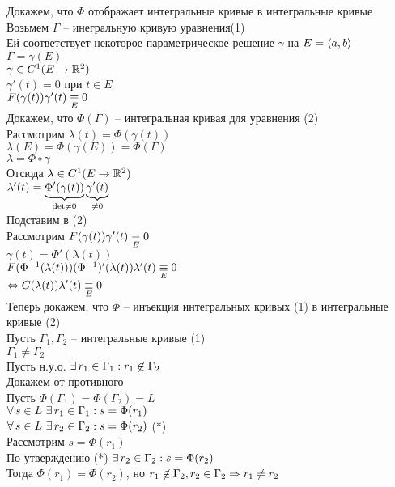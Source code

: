 \documentclass[12pt]{article}
\begin{document}
Докажем, что $\Phi$ отображает интегральные кривые в интегральные кривые\\
Возьмем $\Gamma$ -- инегральную кривую уравнения(1)\\
Ей соответствует некоторое параметрическое решение $\gamma$ на $E=\an ab$\\
$\Gamma = \gamma(E)$\\
$\gamma \in C^1(E\rto \Rset^2)$\\
$\gamma'(t) = 0$ при $t \in E$\\
$F(\gamma(t))\gamma'(t) \us E\equiv 0$\\
Докажем, что $\Phi(\Gamma)$ -- интегральная кривая для уравнения (2)\\
Рассмотрим $\lambda(t) = \Phi(\gamma(t))$\\
$\lambda(E) = \Phi(\gamma(E)) = \Phi(\Gamma)$\\
$\lambda = \Phi \circ \gamma$\\
Отсюда $\lambda \in C^1(E \rto \Rset^2)$\\
$\lambda'(t) = \ub{\det \neq 0}{\Phi'(\gamma(t))}\ub{\neq 0}{\gamma'(t)}$\\
Подставим в (2)\\
Рассмотрим $F(\gamma(t))\gamma'(t) \us E\equiv 0$\\
$\gamma(t) = \Phi'(\lambda(t))$\\
$F(\Phi^{-1}(\lambda(t)))(\Phi^{-1})'(\lambda(t))\lambda'(t)\us E\equiv 0$\\
$\LRto G(\lambda(t))\lambda'(t) \us E\equiv 0$\\
Теперь докажем, что $\Phi$ -- инъекция интегральных кривых (1) в интегральные кривые (2)\\
Пусть $\Gamma_1, \Gamma_2$ -- интегральные кривые (1)\\
$\Gamma_1 \neq \Gamma_2$\\
Пусть н.у.о. $\ex r_1 \in \Gamma_1: r_1 \not\in \Gamma_2$\\
Докажем от противного\\
Пусть $\Phi(\Gamma_1) = \Phi(\Gamma_2) = L$\\
$\fall s \in L\ \ex r_1 \in \Gamma_1: s = \Phi(r_1)$\\
$\fall s \in L\ \ex r_2 \in \Gamma_2: s = \Phi(r_2)$ (*)\\
Рассмотрим $s = \Phi(r_1)$\\
По утверждению (*) $\ex r_2 \in \Gamma_2: s = \Phi(r_2)$\\
Тогда $\Phi(r_1) = \Phi(r_2)$, но $r_1 \not\in \Gamma_2, r_2 \in \Gamma_2 \Rto r_1 \neq r_2$\\
\end{document}
